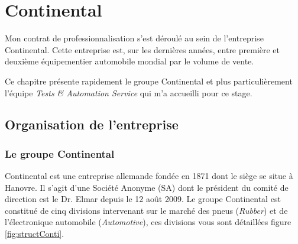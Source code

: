 \chapter{Continental}\label{chapConti}
\putminitoc
Mon contrat de professionnalisation s'est déroulé au sein de l'entreprise Continental. Cette entreprise est, sur les dernières années, entre première et deuxième équipementier automobile mondial par le volume de vente.

Ce chapitre présente rapidement le groupe Continental et plus particulièrement l'équipe \textit{Tests \& Automation Service} qui m'a accueilli pour ce stage.

\section{Organisation de l'entreprise}
\subsection{Le groupe Continental}
Continental est une entreprise allemande fondée en 1871 dont le siège se situe à Hanovre. Il s'agit d'une Société Anonyme (SA) dont le président du comité de
direction est le Dr. Elmar  depuis le 12 août 2009. Le groupe Continental est constitué de cinq divisions intervenant sur le marché des pneus (\textit{Rubber}) et de l'électronique automobile (\textit{Automotive}), ces divisions vous sont détaillées figure \ref{fig:structConti}.

